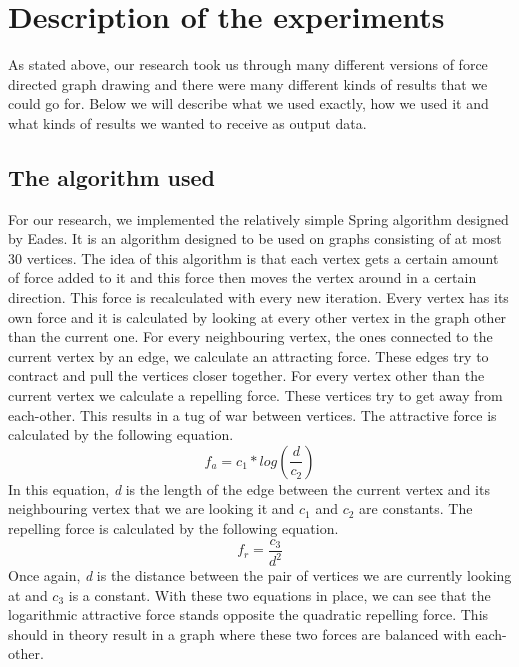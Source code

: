 \documentclass[a4paper,12pt,twoside]{article}
\begin{document}
\section{Description of the experiments}
As stated above, our research took us through many different versions of force directed graph drawing and there were many different kinds of results that we could go for. Below we will describe what we used exactly, how we used it and what kinds of results we wanted to receive as output data.
\subsection{The algorithm used}\label{s:algorithm}
For our research, we implemented the relatively simple Spring algorithm designed by Eades\cite{Eades}. It is an algorithm designed to be used on graphs consisting of at most 30 vertices. The idea of this algorithm is that each vertex gets a certain amount of force added to it and this force then moves the vertex around in a certain direction. This force is recalculated with every new iteration. Every vertex has its own force and it is calculated by looking at every other vertex in the graph other than the current one. For every neighbouring vertex, the ones connected to the current vertex by an edge, we calculate an attracting force. These edges try to contract and pull the vertices closer together. For every vertex other than the current vertex we calculate a repelling force. These vertices try to get away from each-other. This results in a tug of war between vertices. 
\newline
The attractive force is calculated by the following equation.
\begin{equation}\label{e:attract}
f_a = c_1*log(\frac{d}{c_2})
\end{equation}
In this equation, \emph{d} is the length of the edge between the current vertex and its neighbouring vertex that we are looking it and \emph{$c_1$} and \emph{$c_2$} are constants.
\newline
The repelling force is calculated by the following equation.
\begin{equation}\label{e:repel}
f_r = \frac{c_3}{d^2}
\end{equation}
Once again, \emph{d} is the distance between the pair of vertices we are currently looking at and \emph{$c_3$} is a constant. With these two equations in place, we can see that the logarithmic attractive force stands opposite the quadratic repelling force. This should in theory result in a graph where these two forces are balanced with each-other.
\end{document}
